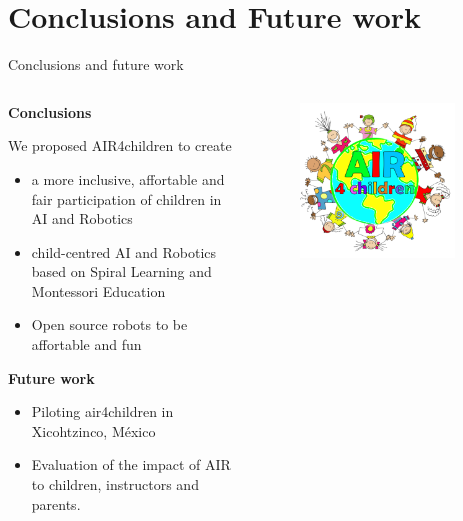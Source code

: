 \section{Conclusions and Future work}

{
\begin{frame}{Conclusions and future work}

  \begin{columns}
  \begin{column}{.75\linewidth}

  \textbf{Conclusions}   

  We proposed AIR4children to create
  \begin{itemize}
    \item a more inclusive, affortable and fair participation of children in AI and Robotics
    \item child-centred AI and Robotics based on Spiral Learning and Montessori Education 
    \item Open source robots to be affortable and fun 
  \end{itemize}

  \textbf{Future work}
  \begin{itemize}
    \item Piloting air4children in Xicohtzinco, M\'exico
    \item Evaluation of the impact of AIR to children, instructors and parents. %
  \end{itemize}

    \end{column}


  \begin{column}{.3\linewidth}

      \begin{figure}
        \centering
        \includegraphics[width=0.9\textwidth]{./figures/future-work/versions/drawing-v00.png}
      \end{figure}


\end{column}
\end{columns}
\end{frame}}
